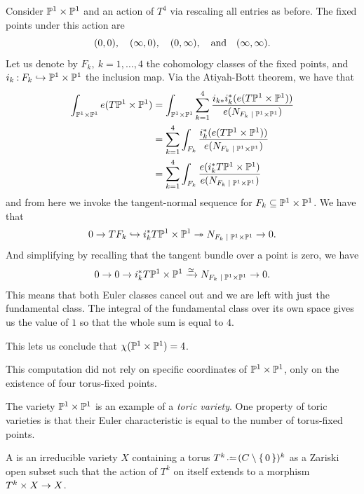 \documentclass[12pt]{memoir}
\begin{document}
\begin{Ex}
    Consider $\mathbb{P}^1\times\mathbb{P}^1$ and an action of $T^4$ via rescaling all entries as before. The fixed points under this action are 
    $$(0,0),\quad(\infty,0),\quad(0,\infty),\quad\text{and}\quad(\infty,\infty).$$
    Let us denote by $F_k,\ k=1,\dots,4$ the cohomology classes of the fixed points, and $i_k\mathbin{:}F_k\hookrightarrow\mathbb{P}^1\times\mathbb{P}^1$ the inclusion map.
    Via the Atiyah-Bott theorem, we have that 
    \begin{align*}
    \int_{\bP^1\x\bP^1}e(T\bP^1\x\bP^1)&=\int_{\bP^1\x\bP^1}\sum_{k=1}^{4}\frac{i_{k\ast} i^\ast_k(e(T\bP^1\x\bP^1))}{e(N_{F_k\mid\bP^1\x\bP^1})}\\
    &=\sum_{k=1}^{4}\int_{F_k}\frac{ i^\ast_k(e(T\bP^1\x\bP^1))}{e(N_{F_k\mid\bP^1\x\bP^1})}\\
    &=\sum_{k=1}^{4}\int_{F_k}\frac{ e(i^\ast_kT\bP^1\x\bP^1)}{e(N_{F_k\mid\bP^1\x\bP^1})}
    \end{align*}
    and from here we invoke the tangent-normal sequence for $F_k\subseteq\mathbb{P}^1\times\mathbb{P}^1$. We have that 
    $$0\to TF_k\hookto i_k^\ast T\bP^1\x\bP^1\onto N_{F_k\mid\bP^1\x\bP^1}\to0.$$
    And simplifying by recalling that the tangent bundle over a point is zero, we have 
    $$0\to0\to i_k^\ast T\bP^1\x\bP^1\xrightarrow[]{\isom} N_{F_k\mid\bP^1\x\bP^1}\to0.$$
    This means that both Euler classes cancel out and we are left with just the fundamental class. The integral of the fundamental class over its own space gives us the value of $1$ so that the whole sum is equal to $4$.\par
    This lets us conclude that $\chi(\mathbb{P}^1\times\mathbb{P}^1)=4$.
\end{Ex}

\begin{Rmk}
    This computation did not rely on specific coordinates of $\mathbb{P}^1 \times \mathbb{P}^1$, only on the existence of four torus-fixed points.
\end{Rmk}

The variety $\mathbb{P}^1 \times \mathbb{P}^1$ is an example of a \emph{toric variety}. One property of toric varieties is that their Euler characteristic is equal to the number of torus-fixed points.

\begin{Def}
    A  is an irreducible variety $X$ containing a torus $T^k\defeq(C\less\set{0})^k$ as a Zariski open subset such that the action of $T^k$ on itself extends to a morphism $T^k\times X\to X$.
\end{Def}
\end{document}
